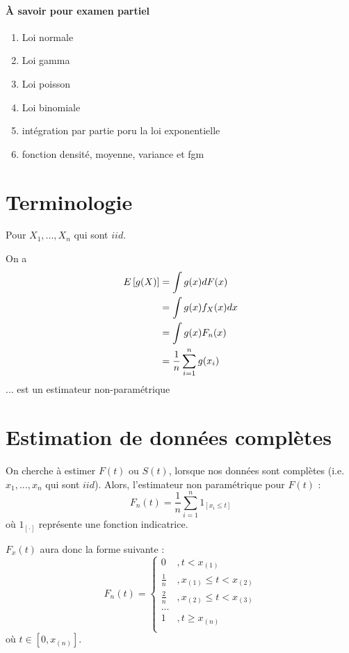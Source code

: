 \documentclass[12pt, french]{report}
\begin{document}
\paragraph{À savoir pour examen partiel}

\begin{enumerate}[label=\faCheck]
\item Loi normale
\item Loi gamma
\item Loi poisson
\item Loi binomiale
\item intégration par partie poru la loi exponentielle
\item fonction densité, moyenne, variance et fgm
\end{enumerate}

\section{Terminologie}
Pour $X_1, ..., X_n $ qui sont $iid$.

On a
\begin{align*}
E \left[ g(X) \right] & = \int g(x) d F(x) \\
	& = \int g(x) f_X(x) dx \\
	& = \int g(x) F_n(x) \\
	& = \frac{1}{n} \sum_{i=1}^{n} g(x_i) \\
\end{align*}
... est un estimateur non-paramétrique

\section{Estimation de données complètes}
On cherche à estimer $F(t)$ ou $S(t)$, lorsque nos données sont complètes (i.e. $x_1, ..., x_n$ qui sont $iid$). Alors, l'estimateur non paramétrique pour $F(t)$ : 
\begin{equation}
F_n(t)	 = \frac{1}{n} \sum_{i=1}^{n} 1_{[x_i \leq t]}
\end{equation}
où $1_{[\cdot]}$ représente une fonction indicatrice.

$F_x(t)$ aura donc la forme suivante : 
\begin{equation}
F_n(t) =
\begin{cases}
0				& , t < x_{(1)} \\
\frac{1}{n}		& , x_{(1)} \leq t < x_{(2)} \\
\frac{2}{n}		& , x_{(2)} \leq t < x_{(3)} \\
...				& \\
1				& , t \geq x_{(n)} \\
\end{cases}
\end{equation}
où $t \in [0, x_{(n)}]$.
\end{document}
